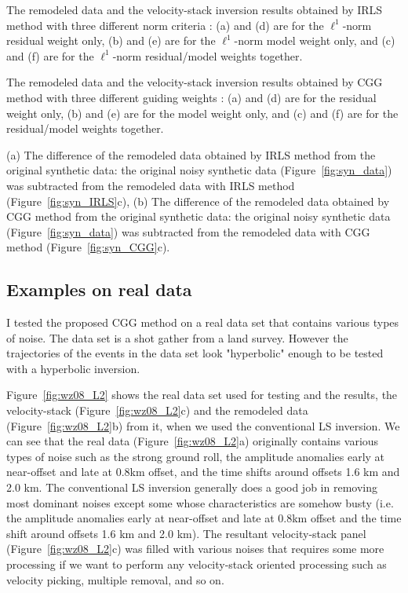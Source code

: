 {The remodeled data and the velocity-stack inversion results obtained by IRLS method 
with three different norm criteria : (a) and (d) are for the $\ell^1$-norm residual weight only,
(b) and (e) are for the $\ell^1$-norm model weight only,
and (c) and (f) are for the $\ell^1$-norm residual/model weights together.}

{The remodeled data and the velocity-stack inversion results obtained by CGG method 
with three different guiding weights : (a) and (d) are for the residual weight only, 
(b) and (e) are for the model weight only,
and (c) and (f) are for the residual/model weights together.}

{ (a) The difference of the remodeled data obtained by IRLS method from the original synthetic data: 
the original noisy synthetic data (Figure~\protect\ref{fig:syn_data}) was subtracted 
 from the remodeled data with IRLS method (Figure~\protect\ref{fig:syn_IRLS}c),
(b) The difference of the remodeled data obtained by CGG method from the original synthetic data: 
the original noisy synthetic data (Figure~\protect\ref{fig:syn_data}) was subtracted 
 from the remodeled data with CGG method (Figure~\protect\ref{fig:syn_CGG}c).
}

\subsection{Examples on real data}
I tested the proposed CGG method on a real data set
that contains various types of noise.  
The data set is a shot gather from a land survey. 
However the trajectories of the events in the data set
look "hyperbolic" enough to be tested with a hyperbolic inversion.

Figure~\ref{fig:wz08_L2} shows the real data set used for testing
and the results, the velocity-stack (Figure~\ref{fig:wz08_L2}c) and 
the remodeled data (Figure~\ref{fig:wz08_L2}b) from it, when we used the conventional LS inversion. 
We can see that the real data (Figure~\ref{fig:wz08_L2}a) originally contains 
various types of noise such as the strong ground roll, 
the amplitude anomalies early at near-offset and 
late at 0.8km offset, 
and the time shifts around offsets 1.6 km and 2.0 km.
The conventional LS inversion generally does a good job in removing most dominant noises
except some whose characteristics are somehow busty (i.e. the amplitude anomalies early at near-offset and 
late at 0.8km offset and the time shift around offsets 1.6 km and 2.0 km).
The resultant velocity-stack panel (Figure~\ref{fig:wz08_L2}c) was filled with various noises that
requires some more processing if we want to perform any velocity-stack oriented processing 
such as velocity picking, multiple removal, and so on.

